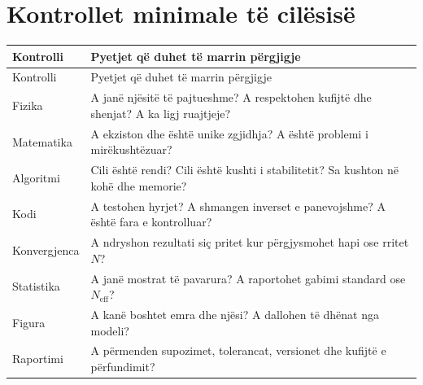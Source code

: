 \documentclass[11pt,oneside,openany]{book}
\begin{document}
\section{Kontrollet minimale të cilësisë}
\begin{longtable}{p{}p{}}
\toprule
Kontrolli & Pyetjet që duhet të marrin përgjigje\\ \midrule
\endfirsthead
\toprule Kontrolli & Pyetjet që duhet të marrin përgjigje\\ \midrule\endhead
Fizika & A janë njësitë të pajtueshme? A respektohen kufijtë dhe shenjat? A ka ligj ruajtjeje?\\
Matematika & A ekziston dhe është unike zgjidhja? A është problemi i mirëkushtëzuar?\\
Algoritmi & Cili është rendi? Cili është kushti i stabilitetit? Sa kushton në kohë dhe memorie?\\
Kodi & A testohen hyrjet? A shmangen inverset e panevojshme? A është fara e kontrolluar?\\
Konvergjenca & A ndryshon rezultati siç pritet kur përgjysmohet hapi ose rritet $N$?\\
Statistika & A janë mostrat të pavarura? A raportohet gabimi standard ose $N_{\mathrm{eff}}$?\\
Figura & A kanë boshtet emra dhe njësi? A dallohen të dhënat nga modeli?\\
Raportimi & A përmenden supozimet, tolerancat, versionet dhe kufijtë e përfundimit?\\
\bottomrule
\end{longtable}
\end{document}
